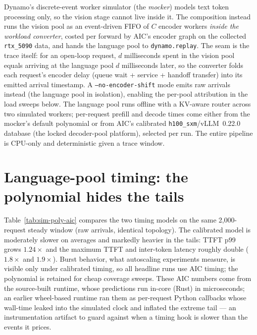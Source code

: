 Dynamo's discrete-event worker simulator (the \emph{mocker}) models text
token processing only, so the vision stage cannot live inside it. The
composition instead runs the vision pool as an event-driven FIFO of $C$
encoder workers \emph{inside the workload converter}, costed per forward
by AIC's encoder graph on the collected \texttt{rtx\_5090} data, and
hands the language pool to \texttt{dynamo.replay}. The seam is the trace
itself: for an open-loop request, $d$ milliseconds spent in the vision
pool equals arriving at the language pool $d$ milliseconds later, so the
converter folds each request's encoder delay (queue wait + service +
handoff transfer) into its emitted arrival timestamp. A
\texttt{--no-encoder-shift} mode emits raw arrivals instead (the
language pool in isolation), enabling the per-pool attribution
in the load sweeps below. The language pool runs offline with a
KV-aware router across two simulated workers; per-request prefill and
decode times come either from the mocker's default polynomial or from AIC's
calibrated \texttt{h100\_sxm}/vLLM~0.22.0 database (the locked decoder-pool
platform), selected per run. The entire pipeline is CPU-only and
deterministic given a trace window.

\section{Language-pool timing: the polynomial hides the tails}
\label{sec:sim-timing}

Table~\ref{tab:sim-poly-aic} compares the two timing models on the same
2{,}000-request steady window (raw arrivals, identical topology). The
calibrated model is moderately slower on averages and markedly heavier in
the tails: TTFT p99 grows $1.24\times$ and the maximum TTFT and inter-token
latency roughly double ($1.8\times$ and $1.9\times$). Burst behavior,
what autoscaling experiments measure, is visible only under
calibrated timing, so all headline runs use AIC timing; the polynomial
is retained for cheap coverage sweeps. These AIC
numbers come from the source-built runtime, whose predictions run in-core
(Rust) in microseconds; an earlier wheel-based runtime ran them as
per-request Python callbacks whose wall-time leaked into the simulated clock
and inflated the extreme tail --- an instrumentation artifact to guard
against when a timing hook is slower than the events it prices.

